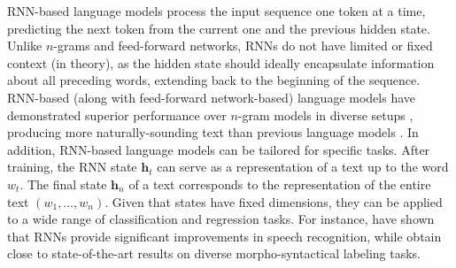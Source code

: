 


\ac{RNN}-based language models process the input sequence one token at a time, predicting the next token from the current one and the previous hidden state. Unlike $n$-grams and feed-forward networks, \acp{RNN} do not have limited or fixed context (in theory), as the hidden state should ideally encapsulate information about all preceding words, extending back to the beginning of the sequence.
\ac{RNN}-based (along with feed-forward network-based) language models have demonstrated superior performance over $n$-gram models in diverse setups \citep{mikolov2010recurrent}, producing more naturally-sounding text than previous language models \citep{kovavcevic2022bidirectional}. In addition, \ac{RNN}-based language models can be tailored for specific tasks. After training, the \ac{RNN} state $\bm{h}_t$ can serve as a representation of a text up to the word $w_t$. The final state $\bm{h}_{n}$ of a text corresponds to the representation of the entire text $(w_1, \ldots, w_n)$. Given that states have fixed dimensions, they can be applied to a wide range of classification and regression tasks. For instance, \citet{schwenk2007continuous} have shown that \acp{RNN} provide significant improvements in speech recognition, while \citet{collobert2011deep} obtain close to state-of-the-art results on diverse morpho-syntactical labeling tasks.

